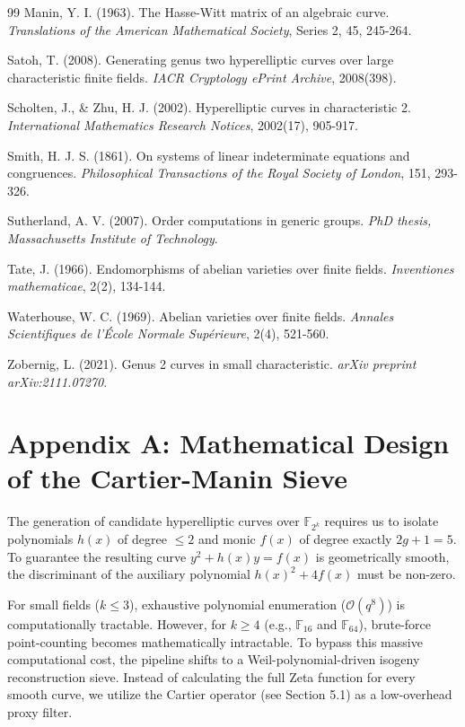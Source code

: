 \documentclass[letterpaper, 11pt]{article}
\begin{document}
\begin{thebibliography}{99}
Manin, Y. I. (1963). The Hasse-Witt matrix of an algebraic curve. \textit{Translations of the American Mathematical Society}, Series 2, 45, 245-264.

Satoh, T. (2008). Generating genus two hyperelliptic curves over large characteristic finite fields. \textit{IACR Cryptology ePrint Archive}, 2008(398).

Scholten, J., \& Zhu, H. J. (2002). Hyperelliptic curves in characteristic 2. \textit{International Mathematics Research Notices}, 2002(17), 905-917.

Smith, H. J. S. (1861). On systems of linear indeterminate equations and congruences. \textit{Philosophical Transactions of the Royal Society of London}, 151, 293-326.

Sutherland, A. V. (2007). Order computations in generic groups. \textit{PhD thesis, Massachusetts Institute of Technology}.

Tate, J. (1966). Endomorphisms of abelian varieties over finite fields. \textit{Inventiones mathematicae}, 2(2), 134-144.

Waterhouse, W. C. (1969). Abelian varieties over finite fields. \textit{Annales Scientifiques de l'\'{E}cole Normale Sup\'{e}rieure}, 2(4), 521-560.

Zobernig, L. (2021). Genus 2 curves in small characteristic. \textit{arXiv preprint arXiv:2111.07270}.

\end{thebibliography}

\appendix

\section{Appendix A: Mathematical Design of the Cartier-Manin Sieve}
The generation of candidate hyperelliptic curves over $\mathbb{F}_{2^k}$ requires us to isolate polynomials $h(x)$ of degree $\le 2$ and monic $f(x)$ of degree exactly $2g+1=5$. To guarantee the resulting curve $y^2 + h(x)y = f(x)$ is geometrically smooth, the discriminant of the auxiliary polynomial $h(x)^2 + 4f(x)$ must be non-zero. 

For small fields ($k \le 3$), exhaustive polynomial enumeration ($\mathcal{O}(q^8)$) is computationally tractable. However, for $k \ge 4$ (e.g., $\mathbb{F}_{16}$ and $\mathbb{F}_{64}$), brute-force point-counting becomes mathematically intractable. To bypass this massive computational cost, the pipeline shifts to a Weil-polynomial-driven isogeny reconstruction sieve. Instead of calculating the full Zeta function for every smooth curve, we utilize the Cartier operator (see Section 5.1) as a low-overhead proxy filter.
\end{document}
